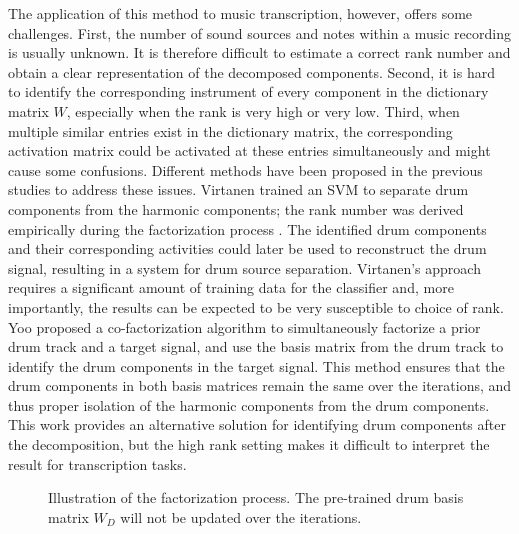 \documentclass{article}
\begin{document}
The application of this method to music transcription, however, offers some challenges. 
First, the number of sound sources and notes within a music recording is usually unknown. It is therefore difficult to estimate a correct rank number and obtain a clear representation of the decomposed  components. 
Second, it is hard to identify the corresponding instrument of every component in the dictionary matrix $W$, especially when the rank is very high or very low. 
Third, when multiple similar entries exist in the dictionary matrix, the corresponding activation matrix could be activated at these entries simultaneously and might cause some confusions. %
Different methods have been proposed in the previous studies to address these issues. Virtanen trained an SVM to separate drum components from the harmonic components; the rank number was derived empirically during the factorization process \cite{helen_separation_2005}. The identified drum components and their corresponding activities could later be used to reconstruct the drum signal, resulting in a system for drum source separation. Virtanen's approach requires a significant amount of training data for the classifier and, more importantly, the results can be expected to be very susceptible to choice of rank. %
Yoo proposed a co-factorization algorithm \cite{yoo_nonnegative_2010} to simultaneously factorize a prior drum track and a target signal, and use the basis matrix from the drum track to identify the drum components in the target signal. This method ensures that the drum components in both basis matrices remain the same over the iterations, and thus proper isolation of the harmonic components from the drum components. This work provides an alternative solution for identifying drum components after the decomposition, but the high rank setting makes it difficult to interpret the result for transcription tasks.

\begin{figure}
 \centerline{}
 \caption{Illustration of the factorization process. The pre-trained drum basis matrix $W_D$ will not be updated over the iterations.} %
 \label{fig:factorization}
\end{figure}
\end{document}
